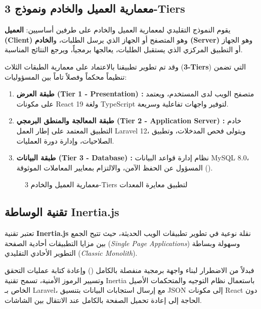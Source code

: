 \documentclass{bts-report-ar}
\begin{document}
\subsection{معمارية العميل والخادم ونموذج 3-Tiers}
يقوم النموذج التقليدي لمعمارية العميل والخادم على طرفين أساسيين: \textbf{العميل (Client)} وهو المتصفح أو الجهاز الذي يرسل الطلبات، و\textbf{الخادم (Server)} وهو الجهاز أو التطبيق المركزي الذي يستقبل الطلبات، يعالجها برمجياً، ويرجع النتائج المناسبة.

وقد تم تطوير تطبيقنا بالاعتماد على معمارية الطبقات الثلاث (\textbf{3-Tiers}) التي تضمن تنظيماً محكماً وفصلاً تاماً بين المسؤوليات:
\begin{enumerate}
  \item \textbf{طبقة العرض (Tier 1 - Presentation) :} متصفح الويب لدى المستخدم، ويعتمد على مكونات React 19 ولغة TypeScript لتوفير واجهات تفاعلية وسريعة.
  \item \textbf{طبقة المعالجة والمنطق البرمجي (Tier 2 - Application Server) :} خادم التطبيق المعتمد على إطار العمل Laravel 12، ويتولى فحص المدخلات، وتطبيق الصلاحيات، وإدارة دورة العمليات.
  \item \textbf{طبقة البيانات (Tier 3 - Database) :} نظام إدارة قواعد البيانات MySQL 8.0، المسؤول عن الحفظ الآمن، والالتزام بمعايير المعاملات الموثوقة ().
\end{enumerate}

\begin{figure}[H]
  \centering
  \begin{LTR}
  
  \end{LTR}
  \caption{معمارية العميل والخادم 3-Tiers لتطبيق معايرة المعدات}
  \label{fig:web-arch}
\end{figure}

\subsection{تقنية الوساطة Inertia.js}
تعتبر تقنية \textbf{Inertia.js} نقلة نوعية في تطوير تطبيقات الويب الحديثة، حيث تتيح الجمع بين مزايا التطبيقات أحادية الصفحة (\textit{Single Page Applications}) وسهولة وبساطة التطوير الأحادي التقليدي (\textit{Classic Monolith}).

فبدلاً من الاضطرار لبناء واجهة برمجية منفصلة بالكامل () وإعادة كتابة عمليات التحقق وتسيير الرموز الأمنية، تسمح تقنية Inertia باستعمال نظام التوجيه والمتحكمات الأصيل الخاص بـ Laravel، مع إرسال استجابات البيانات بتنسيق JSON إلى مكونات React دون الحاجة إلى إعادة تحميل الصفحة بالكامل عند الانتقال بين الشاشات.
\end{document}
